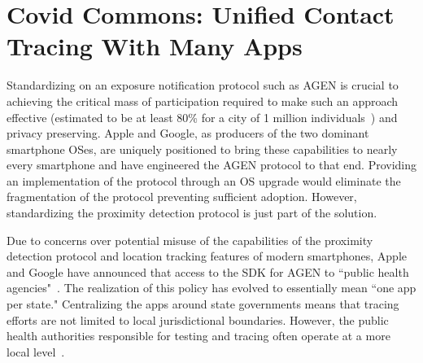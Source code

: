 \section{Covid Commons: Unified Contact Tracing With Many Apps}
\label{sec:commons}


Standardizing on an exposure notification protocol such as AGEN is crucial to achieving the critical mass of participation required to make such an approach effective (estimated to be at least 80\% for a city of 1 million individuals~\cite{hinch2020effective}) and privacy preserving.
Apple and Google, as producers of the two dominant smartphone OSes, are uniquely positioned to bring these capabilities to nearly every smartphone and have engineered the AGEN protocol to that end.
Providing an implementation of the protocol through an OS upgrade would eliminate the fragmentation of the protocol preventing sufficient adoption.
However, standardizing the proximity detection protocol is just part of the solution.

Due to concerns over potential misuse of the capabilities of the proximity detection protocol and location tracking features of modern smartphones, Apple and Google have announced that access to the SDK for AGEN to ``public health agencies"~\cite{agen_pha_announce}.
The realization of this policy has evolved to essentially mean ``one app per state."
Centralizing the apps around state governments means that tracing efforts are not limited to local jurisdictional boundaries. 
However, the public health authorities responsible for testing and tracing often operate at a more local level~\cite{bay_area_testing, local_testing_sites}.


